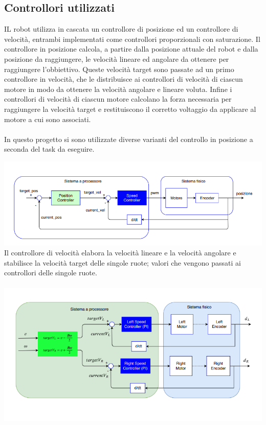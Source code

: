 \documentclass{article}
\begin{document}
\subsection{Controllori utilizzati}
IL robot utilizza in cascata un controllore di posizione ed un controllore di velocità, entrambi implementati come controllori proporzionali con saturazione. Il controllore in posizione calcola, a partire dalla posizione attuale del robot e dalla posizione da raggiungere, le velocità lineare ed angolare da ottenere per raggiungere l'obbiettivo. Queste velocità target sono passate ad un primo controllore in velocità, che le distribuisce ai controllori di velocità di ciascun motore in modo da ottenere la velocità angolare e lineare voluta. Infine i controllori di velocità di ciascun motore calcolano la forza necessaria per raggiungere la velocità target e restituiscono il corretto voltaggio da applicare al motore a cui sono associati.
\paragraph{}
In questo progetto si sono utilizzate diverse varianti del controllo in posizione a seconda del task da eseguire.


\includegraphics[scale=0.45]{media/schema controllore 1.png}
Il controllore di velocità elabora la velocità lineare e la velocità angolare e stabilisce la velocità target delle singole ruote; valori che vengono passati ai controllori delle singole ruote.
\paragraph{}
\includegraphics[scale=0.45]{media/schema controllore 2.png}
\end{document}
